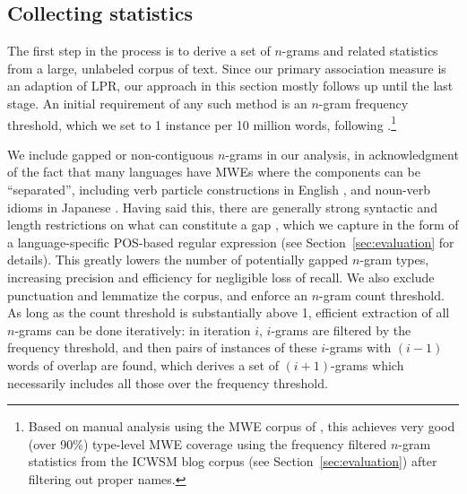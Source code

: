 \documentclass[11pt,letterpaper]{article}
\newcommand{\secref}[2][]{Section#1~\ref{#2}\xspace}
\begin{document}
\subsection{Collecting statistics}

The first step in the process is to derive a set of $n$-grams and related statistics from a large, unlabeled corpus of text. Since our primary association measure is an adaption of LPR, our approach in this section mostly follows  up until the last stage. An initial requirement of any such method is an $n$-gram frequency threshold, which we set to 1 instance per 10 million words, following .\footnote{Based on manual analysis using the MWE corpus of , this achieves very good (over 90\%) type-level MWE coverage using the frequency filtered $n$-gram statistics from the ICWSM blog corpus (see \secref{sec:evaluation}) after filtering out proper names.} 

We include gapped or non-contiguous $n$-grams in our analysis, in acknowledgment of the fact that many languages have MWEs where the components can be ``separated'', including verb particle constructions in English \cite{Dehe:2002}, and noun-verb idioms in Japanese \cite{Hashimoto:Kawahara:2008}. Having said this, there are generally strong syntactic and length restrictions on what can constitute a gap \cite{Wasow:2002}, which we capture in the form of a language-specific POS-based regular expression (see \secref{sec:evaluation} for details).
This greatly lowers the number of potentially gapped $n$-gram types, increasing precision and efficiency for negligible loss of recall. We also exclude punctuation and lemmatize the corpus, and enforce an $n$-gram count threshold. As long as the count threshold  is substantially above 1, efficient extraction of all $n$-grams can be done iteratively: in iteration $i$, $i$-grams are filtered by the frequency threshold, and then pairs of instances of these $i$-grams with $(i-1)$ words of overlap are found, which derives a set of $(i+1)$-grams which necessarily includes all those over the frequency threshold. 
\end{document}
